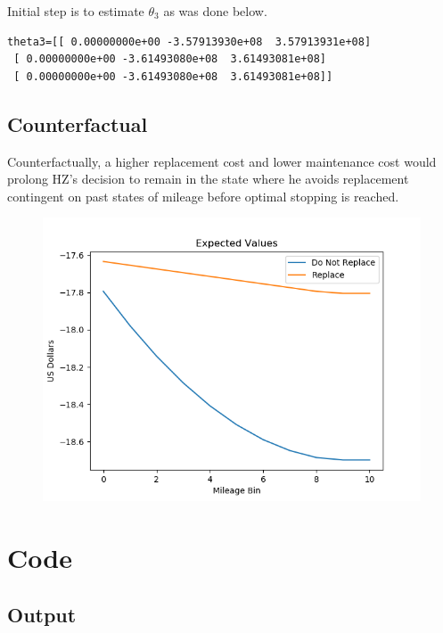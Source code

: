 \documentclass{article}
\begin{document}
Initial step is to estimate $\theta_3$ as was done below.

\begin{lstlisting}
theta3=[[ 0.00000000e+00 -3.57913930e+08  3.57913931e+08]
 [ 0.00000000e+00 -3.61493080e+08  3.61493081e+08]
 [ 0.00000000e+00 -3.61493080e+08  3.61493081e+08]]
\end{lstlisting}

\subsection{Counterfactual}

Counterfactually, a higher replacement cost and lower maintenance cost would prolong HZ's decision to remain in the state where he avoids replacement contingent on past states of mileage before optimal stopping is reached.

\begin{figure}[h]
  \centering
    \includegraphics[width=1.0\textwidth]{Figure_4}
\end{figure}
\FloatBarrier

\newpage

\section{Code}

\subsection{Output}
\end{document}
